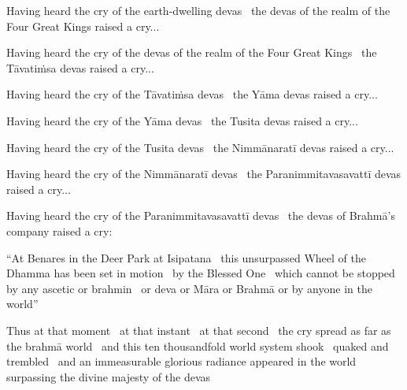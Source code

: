 \begin{english-only-hang}
  Having heard the cry of the earth-dwelling devas \breathmark\ the devas of the realm of the Four Great Kings raised a cry...
\end{english-only-hang}

\begin{english-only-hang}
  Having heard the cry of the devas of the realm of the Four Great Kings \breathmark\ the Tāvatiṁsa devas raised a cry...
\end{english-only-hang}

\begin{english-only-hang}
  Having heard the cry of the Tāvatiṁsa devas \breathmark\ the Yāma devas raised a cry...
\end{english-only-hang}

\begin{english-only-hang}
  Having heard the cry of the Yāma devas \breathmark\ the Tusita devas raised a cry...
\end{english-only-hang}

\begin{english-only-hang}
  Having heard the cry of the Tusita devas \breathmark\ the Nimmānaratī devas raised a cry...
\end{english-only-hang}

\begin{english-only-hang}
  Having heard the cry of the Nimmānaratī devas \breathmark\ the Paranimmitavasavattī devas raised a cry...
\end{english-only-hang}

\begin{english-only-hang}
  Having heard the cry of the Paranimmitavasavattī devas \breathmark\ the devas of Brahmā's company raised a cry:
\end{english-only-hang}

\begin{english-only-hang}
  ``At Benares in the Deer Park at Isipatana \breathmark\ this unsurpassed Wheel of the Dhamma has been set in motion \breathmark\ by the Blessed One \breathmark\ which cannot be stopped by any ascetic or brahmin \breathmark\ or deva or Māra or Brahmā or by anyone in the world''
\end{english-only-hang}

\begin{english-only-hang}
  Thus at that moment \breathmark\ at that instant \breathmark\ at that second \breathmark\ the cry spread as far as the brahmā world \breathmark\ and this ten thousandfold world system shook \breathmark\ quaked and trembled \breathmark\ and an immeasurable glorious radiance appeared in the world surpassing the divine majesty of the devas
\end{english-only-hang}

